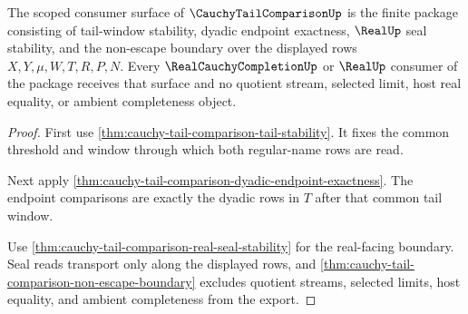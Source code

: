 \begin{theorem}
\label{thm:cauchy-tail-comparison-scoped-export}
The scoped consumer surface of $\CauchyTailComparisonUp$ is the finite package
consisting of tail-window stability, dyadic endpoint exactness,
$\RealUp$ seal stability, and the non-escape boundary over the displayed rows
$X,Y,\mu,W,T,R,P,N$. Every $\RealCauchyCompletionUp$ or $\RealUp$ consumer of
the package receives that surface and no quotient stream, selected limit, host
real equality, or ambient completeness object.
\end{theorem}
\begin{proof}
First use \autoref{thm:cauchy-tail-comparison-tail-stability}. It fixes the
common threshold and window through which both regular-name rows are read.

Next apply
\autoref{thm:cauchy-tail-comparison-dyadic-endpoint-exactness}. The endpoint
comparisons are exactly the dyadic rows in $T$ after that common tail window.

Use \autoref{thm:cauchy-tail-comparison-real-seal-stability} for the
real-facing boundary. Seal reads transport only along the displayed rows, and
\autoref{thm:cauchy-tail-comparison-non-escape-boundary} excludes quotient
streams, selected limits, host equality, and ambient completeness from the
export.
\end{proof}

